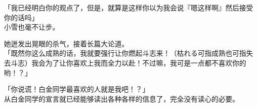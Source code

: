 「我已经明白你的观点了，但是，就算是这样你以为我会说『嗯这样啊』然后接受你的话吗」\\

小雪也毫不让步。

她迸发出晃眼的杀气，接着长篇大论道。\\

「既然你这么成熟的话，我就要强行让你燃起斗志来！（枯れる可指成熟也可指失去斗志）我会为了让你喜欢上我而全力以赴！不过嘛，我可是一点都不喜欢你的哟！？」

「你说谎！白金同学最喜欢的人就是我吧！？」\\

从白金同学的宣言就已经能够读出各种各样的信息了，完全没有读心的必要。
